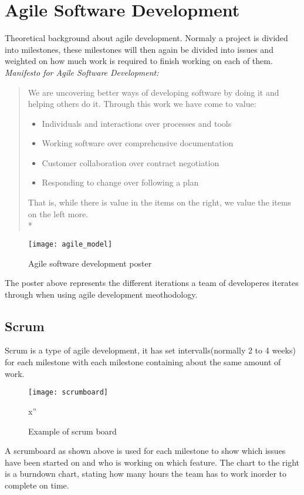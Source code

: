 \section{Agile Software Development}
Theoretical background about agile development. Normaly a project is divided into milestones, these milestones will then again be divided into issues and weighted on how much work is required to finish working on each of them.\linebreak
\emph{Manifesto for Agile Software Development:}\cite{agilemanifesto}
\begin{quotation}
We are uncovering better ways of developing software by doing it and helping others do it. Through this work we have come to value:
\begin{itemize}
\item Individuals and interactions over processes and tools
\item Working software over comprehensive documentation
\item Customer collaboration over contract negotiation
\item Responding to change over following a plan
\end{itemize}
That is, while there is value in the items on
the right, we value the items on the left more.\\*
\end{quotation}

\begin{figure}[!htpb]
\centering
	\texttt{[image: agile\_model]}
\caption{Agile software development poster}
\label{logo}
\end{figure}

The poster above represents the different iterations a team of developeres iterates through when using agile development meothodology.

\subsection{Scrum}
Scrum is a type of agile development, it has set intervalls(normally 2 to 4 weeks) for each milestone with each milestone containing about the same amount of work.

\begin{figure}[!htpb]
\centering
	\texttt{[image: scrumboard]}
\caption{Example of scrum board}
\label{logo}x''
\end{figure}

A scrumboard as shown above is used for each milestone to show which issues have been started on and who is working on which feature. The chart to the right is a burndown chart, stating how many hours the team has to work inorder to complete on time.